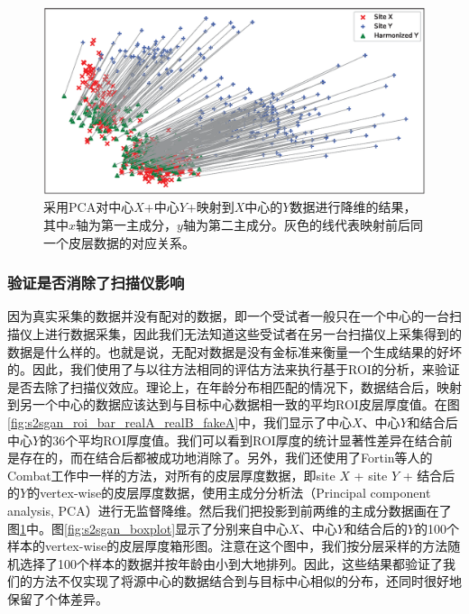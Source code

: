\begin{figure}[t]
\centering
\includegraphics[width=\linewidth]{figure/s2sgan_pca.eps}
\caption{采用PCA对中心$X$+中心$Y$+映射到$X$中心的$Y$数据进行降维的结果，其中$x$轴为第一主成分，$y$轴为第二主成分。灰色的线代表映射前后同一个皮层数据的对应关系。}\label{fig:s2sgan_pca} 
\end{figure} 

\subsubsection{验证是否消除了扫描仪影响}
因为真实采集的数据并没有配对的数据，即一个受试者一般只在一个中心的一台扫描仪上进行数据采集，因此我们无法知道这些受试者在另一台扫描仪上采集得到的数据是什么样的。也就是说，无配对数据是没有金标准来衡量一个生成结果的好坏的。因此，我们使用了与以往方法\cite{karayumak2019retrospective}相同的评估方法来执行基于ROI的分析，来验证是否去除了扫描仪效应。理论上，在年龄分布相匹配的情况下，数据结合后，映射到另一个中心的数据应该达到与目标中心数据相一致的平均ROI皮层厚度值。在图\ref{fig:s2sgan_roi_bar_realA_realB_fakeA}中，我们显示了中心$X$、中心$Y$和结合后中心$Y$的36个平均ROI厚度值。我们可以看到ROI厚度的统计显著性差异在结合前是存在的，而在结合后都被成功地消除了。另外，我们还使用了Fortin等人的Combat\cite{fortin2018harmonization}工作中一样的方法，对所有的皮层厚度数据，即site $X$ + site $Y$ + 结合后的$Y$的vertex-wise的皮层厚度数据，使用主成分分析法（Principal component analysis, PCA）进行无监督降维。然后我们把投影到前两维的主成分数据画在了图\ref{fig:s2sgan_pca}中。图\ref{fig:s2sgan_boxplot}显示了分别来自中心$X$、中心$Y$和结合后的$Y$的100个样本的vertex-wise的皮层厚度箱形图。注意在这个图中，我们按分层采样的方法随机选择了100个样本的数据并按年龄由小到大地排列。因此，这些结果都验证了我们的方法不仅实现了将源中心的数据结合到与目标中心相似的分布，还同时很好地保留了个体差异。

